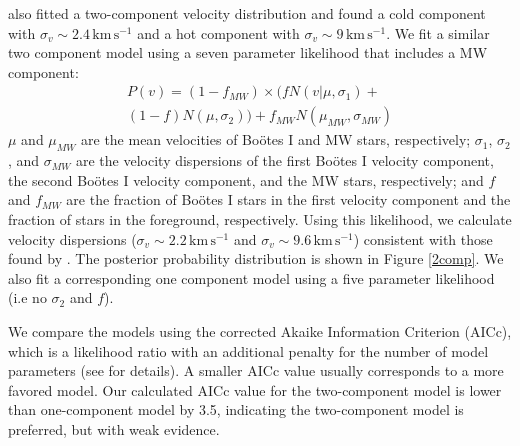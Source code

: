 \documentclass[twocolumn]{aastex63}
\newcommand{\unit}[1]{\ensuremath{\mathrm{\,#1}}\xspace}
\newcommand{\kms}{\unit{km\,s^{-1}}}
\newcommand{\revise}[1]{#1}
\begin{document}
\citet{kop2011} also fitted a two-component velocity distribution and found a cold component with $\sigma_v\sim2.4 \kms$ and a hot component with $\sigma_v\sim9 \kms$. 
We fit a similar two component model using \revise{a seven parameter likelihood that includes a MW component: 
\begin{equation}
\begin{aligned}
P(v) = (1-f_{MW}) \times (fN(v|\mu,\sigma_1) + \\
(1-f)N(\mu,\sigma_2)) + f_{MW}N(\mu_{MW},\sigma_{MW})
\end{aligned}
\end{equation}
$\mu$ and $\mu_{MW}$ are the mean velocities of Bo{\"o}tes I and MW stars, respectively; $\sigma_1$, $\sigma_2$, and $\sigma_{MW}$ are the velocity dispersions of the first Bo{\"o}tes I velocity component, the second Bo{\"o}tes I velocity component, and the MW stars, respectively; and $f$ and $f_{MW}$ are the fraction of Bo{\"o}tes I stars in the first velocity component and the fraction of stars in the foreground, respectively. Using this likelihood, we calculate velocity dispersions ($\sigma_v\sim2.2 \kms$ and  $\sigma_v\sim9.6 \kms$) consistent with those found by \citet{kop2011}. The posterior probability distribution is shown in Figure \ref{2comp}. We also fit a corresponding one component model using a five parameter likelihood (i.e no $\sigma_2$ and $f$). }

\revise{We compare the models using the corrected Akaike Information Criterion (AICc), which is a likelihood ratio with an additional penalty for the number of model parameters (see \citealt{kir2013} for details). 
A smaller AICc value usually corresponds to a more favored model. Our calculated AICc value for the two-component model is lower than one-component model by 3.5, indicating the two-component model is preferred, but with weak evidence.
} 
\end{document}
